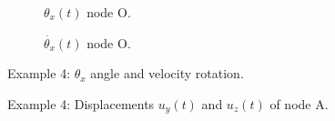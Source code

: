 \documentclass[3p,a4paper,11pt,review]{elsarticle}
\begin{document}
\begin{figure}[htb]
	\begin{subfigure}{0.5\textwidth}
		\centering
		\resizebox{\textwidth}{!}{}
		\caption{$\theta_x(t)$ node O.}
		\label{fig:windTurbineThetaXO}
	\end{subfigure}
	\begin{subfigure}{.5\textwidth}
		\centering
		\resizebox{\textwidth}{!}{}
		\caption{$\dot{\theta_x}(t)$ node O.}
		\label{fig:windTurbineThetadotXO}
	\end{subfigure}
	\caption{Example 4: $\theta_x$ angle and velocity rotation.}
	\label{fig:windTurbineThetaX0}
\end{figure}


\begin{figure}[htb]                  
	\centering                         
	\resizebox{.5\textwidth}{!}{}
	\caption{Example 4: Displacements $u_y(t)$ and $u_z(t)$ of node A.}
	\label{fig:windTurbineDispsA}
\end{figure}
\end{document}

